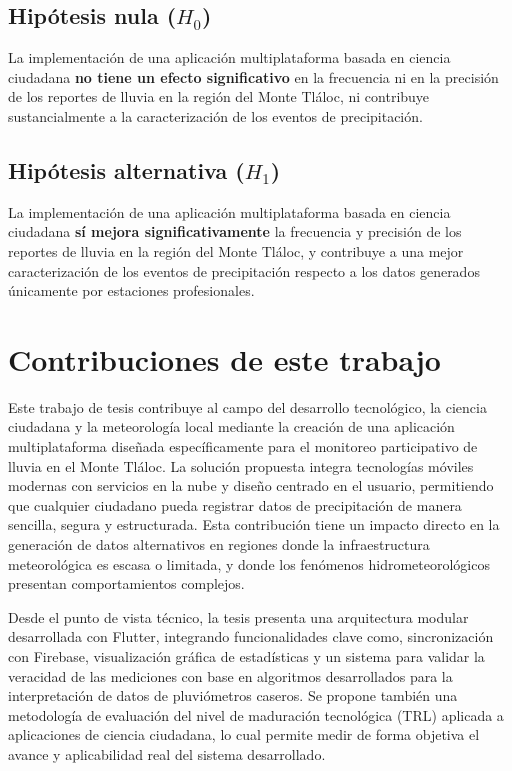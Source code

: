 \subsection{Hipótesis nula ($H_0$)}
La implementación de una aplicación multiplataforma basada en ciencia ciudadana \textbf{no tiene un efecto significativo} en la frecuencia ni en la precisión de los reportes de lluvia en la región del Monte Tláloc, ni contribuye sustancialmente a la caracterización de los eventos de precipitación.

\subsection{Hipótesis alternativa ($H_1$)}
La implementación de una aplicación multiplataforma basada en ciencia ciudadana \textbf{sí mejora significativamente} la frecuencia y precisión de los reportes de lluvia en la región del Monte Tláloc, y contribuye a una mejor caracterización de los eventos de precipitación respecto a los datos generados únicamente por estaciones profesionales.











\section{Contribuciones de este trabajo}

Este trabajo de tesis contribuye al campo del desarrollo tecnológico, la ciencia ciudadana y la meteorología local mediante la creación de una aplicación multiplataforma diseñada específicamente para el monitoreo participativo de lluvia en el Monte Tláloc. La solución propuesta integra tecnologías móviles modernas con servicios en la nube y diseño centrado en el usuario, permitiendo que cualquier ciudadano pueda registrar datos de precipitación de manera sencilla, segura y estructurada. Esta contribución tiene un impacto directo en la generación de datos alternativos en regiones donde la infraestructura meteorológica es escasa o limitada, y donde los fenómenos hidrometeorológicos presentan comportamientos complejos.

Desde el punto de vista técnico, la tesis presenta una arquitectura modular desarrollada con Flutter, integrando funcionalidades clave como, sincronización con Firebase, visualización gráfica de estadísticas y un sistema para validar la veracidad de las mediciones con base en algoritmos desarrollados para la interpretación de datos de pluviómetros caseros. Se propone también una metodología de evaluación del nivel de maduración tecnológica (TRL) aplicada a aplicaciones de ciencia ciudadana, lo cual permite medir de forma objetiva el avance y aplicabilidad real del sistema desarrollado.

